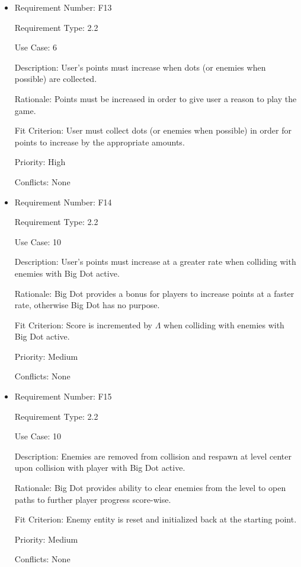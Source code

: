 \documentclass[12pt, titlepage]{article}
\begin{document}
\begin{itemize}
\item
Requirement Number: F13

Requirement Type: 2.2

Use Case: 6

Description: User's points must increase when dots (or enemies when possible) are collected.

Rationale: Points must be increased in order to give user a reason to play the game.

Fit Criterion: User must collect dots (or enemies when possible) in order for points to increase by the appropriate amounts.

Priority: High

Conflicts: None
\end{itemize}

\begin{itemize}
\item
Requirement Number: F14

Requirement Type: 2.2

Use Case: 10

Description: User's points must increase at a greater rate when colliding with enemies with Big Dot active.

Rationale: Big Dot provides a bonus for players to increase points at a faster rate, otherwise Big Dot has no purpose.

Fit Criterion: Score is incremented by $\hyperref[tab:constants]{\Lambda}$ when colliding with enemies with Big Dot active.

Priority: Medium

Conflicts: None
\end{itemize}

\begin{itemize}
\item
Requirement Number: F15

Requirement Type: 2.2

Use Case: 10

Description: Enemies are removed from collision and respawn at level center upon collision with player with Big Dot active.

Rationale: Big Dot provides ability to clear enemies from the level to open paths to further player progress score-wise.

Fit Criterion: Enemy entity is reset and initialized back at the starting point.

Priority: Medium

Conflicts: None
\end{itemize}
\end{document}

